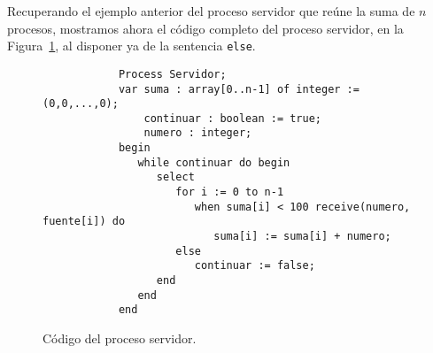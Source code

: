 \begin{ejemplo}
    Recuperando el ejemplo anterior del proceso servidor que reúne la suma de $n$ procesos, mostramos ahora el código completo del proceso servidor, en la Figura~\ref{fig:cod_ejm_select}, al disponer ya de la sentencia \verb|else|.
    \begin{figure}[H]
        \centering
        \begin{verbatim}
            Process Servidor;
            var suma : array[0..n-1] of integer := (0,0,...,0);
                continuar : boolean := true;
                numero : integer;
            begin
               while continuar do begin
                  select 
                     for i := 0 to n-1
                        when suma[i] < 100 receive(numero, fuente[i]) do
                           suma[i] := suma[i] + numero;
                     else 
                        continuar := false;
                  end
               end
            end
        \end{verbatim}
        \caption{Código del proceso servidor.}
        \label{fig:cod_ejm_select}
    \end{figure}
\end{ejemplo}
